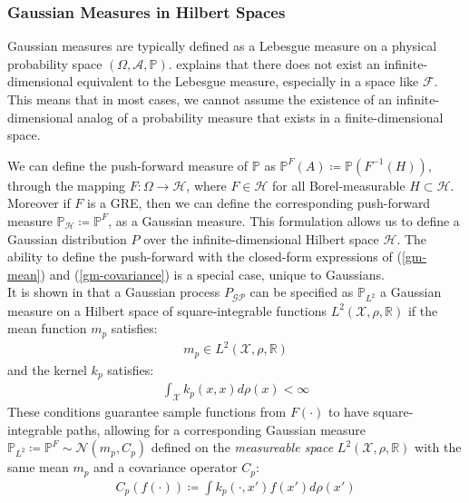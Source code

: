 \documentclass{article}
\newcommand{\GP}{\operatorname{\mathcal{GP}}}
\numberwithin{equation}{section}
\begin{document}
\subsubsection{Gaussian Measures in Hilbert Spaces}
Gaussian measures are typically defined as a Lebesgue measure on a physical probability space $(\Omega, \mathcal{A}, \mathbb{P})$. \cite{matthews2016sparse} explains that there does not exist an infinite-dimensional equivalent to the Lebesgue measure, especially in a space like $\mathcal{F}$. This means that in most cases, we cannot assume the existence of an infinite-dimensional analog of a probability measure that exists in a finite-dimensional space. 

We can define the push-forward measure of $\mathbb{P}$ as $\mathbb{P}^{F}(A) \coloneqq \mathbb{P}(F^{-1}(H))$, through the mapping $F: \Omega \rightarrow \mathcal{H}$, where $F \in \mathcal{H}$ for all Borel-measurable $H \subset \mathcal{H}$. Moreover if $F$ is a GRE, then we can define the corresponding push-forward measure $\mathbb{P}_{\mathcal{H}} \coloneqq \mathbb{P}^{F}$, as a Gaussian measure. This formulation allows us to define a Gaussian distribution $P$ over the infinite-dimensional Hilbert space $\mathcal{H}$. The ability to define the push-forward with the closed-form expressions of (\ref{gm-mean}) and (\ref{gm-covariance}) is a special case, unique to Gaussians.
\newline
\\It is shown in \cite{wild2022generalized} that a Gaussian process $P_{\GP}$ can be specified as $\mathbb{P}_{L^2}$ a Gaussian measure on a Hilbert space of square-integrable functions $L^2(\mathcal{X}, \rho, \mathbb{R})$ if the mean function $m_p$ satisfies:
\begin{align}
    \label{smooth-mean-function-condition}
    m_p \in L^2(\mathcal{X}, \rho, \mathbb{R})
\end{align}
and the kernel $k_p$ satisfies:
\begin{align}
    \int_{\mathcal{X}} k_p(x, x) d\rho(x) < \infty
    \label{trace-kernel-condition}
\end{align}
These conditions guarantee sample functions from $F(\cdot)$ to have square-integrable paths, allowing for a corresponding Gaussian measure $\mathbb{P}_{L^2} \coloneqq \mathbb{P}^F \sim \mathcal{N}(m_p, C_p)$ defined on the \textit{measureable space} $L^2(\mathcal{X}, \rho, \mathbb{R})$ with the same mean $m_p$ and a covariance operator $C_p$:
\begin{align}
    C_p(f(\cdot)) \coloneqq \int k_p(\cdot, x')f(x')d \rho(x')
    \label{gm-covariance-operator}
\end{align}
\end{document}
